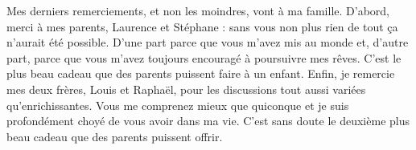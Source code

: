 Mes derniers remerciements, et non les moindres, vont à ma famille. D'abord, merci à mes parents, Laurence et Stéphane : sans vous non plus rien de tout ça n'aurait été possible. D'une part parce que vous m'avez mis au monde et, d'autre part, parce que vous m'avez toujours encouragé à poursuivre mes rêves. C'est le plus beau cadeau que des parents puissent faire à un enfant. Enfin, je remercie mes deux frères, Louis et Raphaël, pour les discussions tout aussi variées qu'enrichissantes. Vous me comprenez mieux que quiconque et je suis profondément choyé de vous avoir dans ma vie. C'est sans doute le deuxième plus beau cadeau que des parents puissent offrir.

\bigskip

